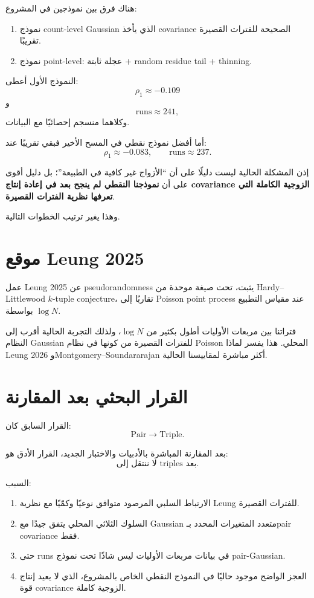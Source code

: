 \documentclass[12pt]{article}
\begin{document}
هناك فرق بين نموذجين في المشروع:

\begin{enumerate}
\item نموذج count-level Gaussian الذي يأخذ covariance الصحيحة للفترات
القصيرة تقريبًا.
\item نموذج point-level: عجلة ثابتة + random residue tail + thinning.
\end{enumerate}

النموذج الأول أعطى:
\[
\rho_1\approx-0.109
\]
و
\[
\mathrm{runs}\approx241,
\]
وكلاهما منسجم إحصائيًا مع البيانات.

أما أفضل نموذج نقطي في المسح الأخير فبقي تقريبًا عند:
\[
\rho_1\approx-0.083,
\qquad
\mathrm{runs}\approx237.
\]

إذن المشكلة الحالية ليست دليلًا على أن ``الأزواج غير كافية في الطبيعة''؛
بل دليل أقوى على أن \textbf{نموذجنا النقطي لم ينجح بعد في إعادة إنتاج
covariance الزوجية الكاملة التي تعرفها نظرية الفترات القصيرة}.

وهذا يغير ترتيب الخطوات التالية.

\section{موقع Leung 2025}

عمل Leung 2025 عن pseudorandomness يثبت، تحت صيغة موحدة من
Hardy--Littlewood \(k\)-tuple conjecture، تقاربًا إلى Poisson point process
عند مقياس التطبيع بواسطة \(\log N\).

فتراتنا بين مربعات الأوليات أطول بكثير من \(\log N\)، ولذلك التجربة الحالية
أقرب إلى النظام Gaussian للفترات القصيرة من كونها في نظام Poisson المحلي.
هذا يفسر لماذا Leung 2026 وMontgomery--Soundararajan أكثر مباشرة
لمقاييسنا الحالية.

\section{القرار البحثي بعد المقارنة}

القرار السابق كان:
\[
\text{Pair}\longrightarrow\text{Triple}.
\]

بعد المقارنة المباشرة بالأدبيات والاختبار الجديد، القرار الأدق هو:
\[
\boxed{
\text{لا ننتقل إلى triples بعد.}
}
\]

السبب:

\begin{enumerate}
\item الارتباط السلبي المرصود متوافق نوعيًا وكمّيًا مع نظرية Leung للفترات القصيرة.
\item السلوك الثلاثي المحلي يتفق جيدًا مع Gaussian متعدد المتغيرات المحدد
بـpair covariance فقط.
\item حتى runs في بيانات مربعات الأوليات ليس شاذًا تحت نموذج pair-Gaussian.
\item العجز الواضح موجود حاليًا في النموذج النقطي الخاص بالمشروع، الذي لا
يعيد إنتاج قوة covariance الزوجية كاملة.
\end{enumerate}
\end{document}
